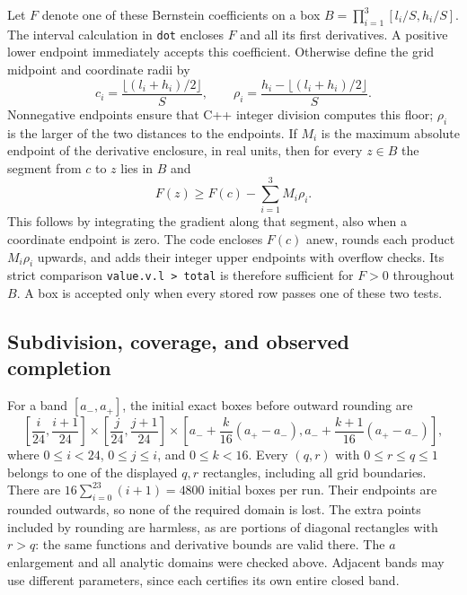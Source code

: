 Let $F$ denote one of these Bernstein coefficients on a box
$B=\prod_{i=1}^3[l_i/S,h_i/S]$.  The interval calculation in
\texttt{dot} encloses $F$ and all its first derivatives.  A positive
lower endpoint immediately accepts this coefficient.  Otherwise
define the grid midpoint and coordinate radii by
\[
 c_i=\frac{\lfloor(l_i+h_i)/2\rfloor}{S},\qquad
 \rho_i=\frac{h_i-\lfloor(l_i+h_i)/2\rfloor}{S}.
\]
Nonnegative endpoints ensure that C++ integer division computes this
floor; $\rho_i$ is the larger of the two distances to the endpoints.
If $M_i$ is the maximum absolute endpoint of the derivative enclosure,
in real units, then for every $z\in B$ the segment from $c$ to $z$
lies in $B$ and
\begin{equation}
 F(z)\ge F(c)-\sum_{i=1}^3M_i\rho_i.
 \label{int:mean-value}
\end{equation}
This follows by integrating the gradient along that segment, also
when a coordinate endpoint is zero.  The code encloses $F(c)$ anew,
rounds each product $M_i\rho_i$ upwards, and adds their integer
upper endpoints with overflow checks.  Its strict comparison
\texttt{value.v.l > total} is therefore sufficient for $F>0$
throughout $B$.  A box is accepted only when every stored row passes
one of these two tests.

\subsection{Subdivision, coverage, and observed completion}
\label{int:coverage}

For a band $[a_-,a_+]$, the initial exact boxes before outward
rounding are
\begin{equation}
 \left[\frac i{24},\frac{i+1}{24}\right]
 \times\left[\frac j{24},\frac{j+1}{24}\right]
 \times\left[a_-+\frac{k}{16}(a_+-a_-),
              a_-+\frac{k+1}{16}(a_+-a_-)\right],
 \label{int:initial-boxes}
\end{equation}
where $0\le i<24$, $0\le j\le i$, and $0\le k<16$.
Every $(q,r)$ with $0\le r\le q\le1$ belongs to one of the displayed
$q,r$ rectangles, including all grid boundaries.  There are
$16\sum_{i=0}^{23}(i+1)=4800$ initial boxes per run.  Their endpoints
are rounded outwards, so none of the required domain is lost.
The extra points included by rounding are harmless, as are portions
of diagonal rectangles with $r>q$: the same functions and derivative
bounds are valid there.  The $a$ enlargement and all analytic domains
were checked above.  Adjacent bands may use different parameters,
since each certifies its own entire closed band.

